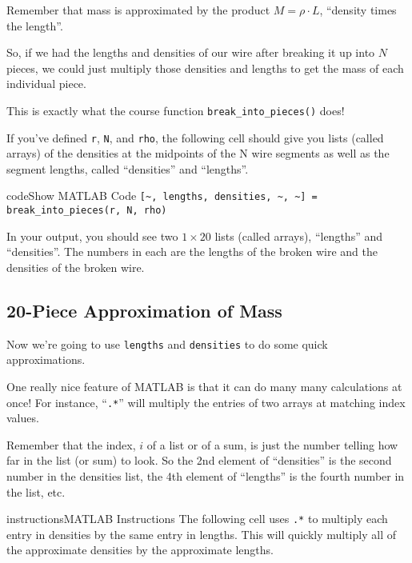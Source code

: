 \documentclass{ximera}
\begin{document}
Remember that mass is approximated by the product $M = \rho \cdot L$, ``density times the length''.

So, if we had the lengths and densities of our wire after breaking it up into $N$ pieces, we could just multiply those densities and lengths to get the mass of each individual piece.

This is exactly what the course function \texttt{break\_into\_pieces()} does!

\begin{remark}
If you've defined \texttt{r}, \texttt{N}, and \texttt{rho}, the following cell should give you lists (called arrays) of the densities at the midpoints of the N wire segments as well as the segment lengths, called ``densities'' and ``lengths''.
\end{remark}

\begin{expandable}{code}{Show MATLAB Code}
\texttt{[\textasciitilde, lengths, densities, \textasciitilde, \textasciitilde] = break\_into\_pieces(r, N, rho)}
\end{expandable}

In your output, you should see two $1\times20$ lists (called arrays), ``lengths'' and ``densities''. The numbers in each are the lengths of the broken wire and the densities of the broken wire.

\subsection*{20-Piece Approximation of Mass}

Now we're going to use \texttt{lengths} and \texttt{densities} to do some quick approximations.

One really nice feature of MATLAB is that it can do many many calculations at once! For instance, ``\texttt{.*}'' will multiply the entries of two arrays at matching index values.

\begin{remark}
Remember that the index, $i$ of a list or of a sum, is just the number telling how far in the list (or sum) to look. So the 2nd element of ``densities'' is the second number in the densities list, the 4th element of ``lengths'' is the fourth number in the list, etc.
\end{remark}

\begin{expandable}{instructions}{MATLAB Instructions}
The following cell uses \texttt{.*} to multiply each entry in densities by the same entry in lengths. This will quickly multiply all of the approximate densities by the approximate lengths.
\end{expandable}
\end{document}
